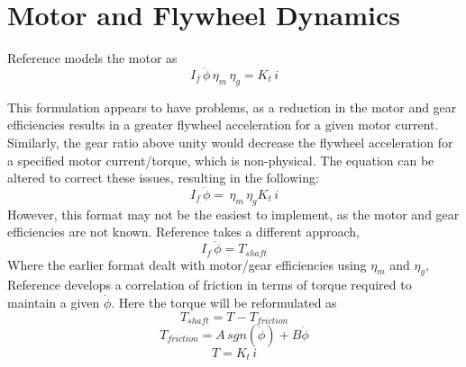 \documentclass[12pt,letterpaper]{article}
\begin{document}
\section{Motor and Flywheel Dynamics}

Reference \cite{reactionWheel} models the motor as 
%
\begin{equation}
    I_{f} \, \ddot{\phi} \, \eta_{m} \, \eta_{g}  = K_{t} \, i
\end{equation}
%



This formulation appears to have problems, as a reduction in the motor and gear efficiencies results in a 
greater flywheel acceleration for a given motor current.  Similarly, the gear ratio above unity would 
decrease the flywheel acceleration for a specified motor current/torque, which is non-physical.  The equation can be altered
to correct these issues, resulting in the following:
%
\begin{equation}
	I_{f} \, \ddot{\phi} = \, \eta_{m} \, \eta_{g} K_{t} \, i
\end{equation}
%
However, this format may not be the easiest to implement, as the motor and gear efficiencies are not known.  Reference \cite{monograph}
takes a different approach,
%
\begin{equation}
    I_{f} \, \ddot{\phi} = T_{shaft}
\end{equation}
%
Where the earlier format dealt with motor/gear efficiencies using $\eta_{m}$ and $\eta_{g}$, Reference \cite{monograph} develops a correlation of friction in terms of torque required to maintain a given $\dot{\phi}$.  Here the torque will be
reformulated as 
%
\begin{equation}
    T_{shaft} = T - T_{friction}
\end{equation}
%
\begin{equation}
    T_{friction} = A \, sgn(\dot{\phi} ) + B \dot{\phi} 
\end{equation}
%
\begin{equation}
    T = K_{t} \, i
\end{equation}
%

\end{document}
